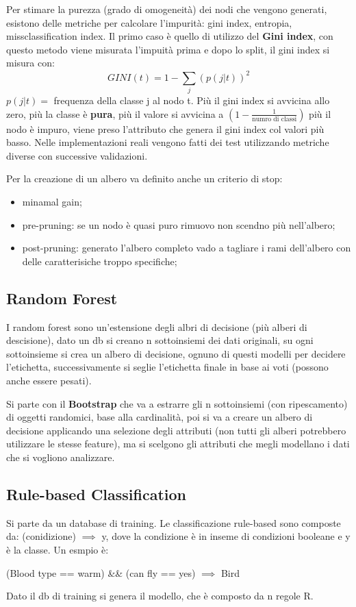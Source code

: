 \documentclass[12pt]{article}
\begin{document}
Per stimare la purezza (grado di omogeneit\`a) dei nodi che vengono generati, esistono delle metriche per calcolare l'impurit\`a: gini index, entropia, missclassification index. Il primo caso \`e quello di utilizzo del \textbf{Gini index}, con questo metodo viene misurata l'impuit\`a prima e dopo lo split, il gini index si misura con:
\[ GINI(t) = 1 - \sum_{j}^{} (p(j|t))^{2} \]
$p(j|t) = $ frequenza della classe j al nodo t. Pi\`u il gini index si avvicina allo zero, pi\`u la classe \`e \textbf{pura}, pi\`u il valore si avvicina a $(1 - \frac{1}{\text{numro di classi}} )$ pi\`u il nodo \`e impuro, viene preso l'attributo che genera il gini index col valori pi\`u basso. Nelle implementazioni reali vengono fatti dei test utilizzando metriche diverse con successive validazioni.

Per la creazione di un albero va definito anche un criterio di stop:
\begin{itemize}
    \item minamal gain;
    \item pre-pruning: se un nodo \`e quasi puro rimuovo non scendno pi\`u nell'albero;
    \item post-pruning: generato l'albero completo vado a tagliare i rami dell'albero con delle caratterisiche troppo specifiche;
\end{itemize}



\subsection{Random Forest}
I random forest sono un'estensione degli albri di decisione (pi\`u alberi di descisione), dato un db si creano n sottoinsiemi dei dati originali, su ogni sottoinsieme si crea un albero di decisione, ognuno di questi modelli per decidere l'etichetta, successivamente si seglie l'etichetta finale in base ai voti (possono anche essere pesati).

Si parte con il \textbf{Bootstrap} che va a estrarre gli n sottoinsiemi (con ripescamento) di oggetti randomici, base alla cardinalit\`a, poi si va a creare un albero di decisione applicando una selezione degli attributi (non tutti gli alberi potrebbero utilizzare le stesse feature), ma si scelgono gli attributi che megli modellano i dati che si vogliono analizzare.


\subsection{Rule-based Classification}
Si parte da un database di training. Le classificazione rule-based sono composte da: (conidizione) $ \implies $ y, dove la condizione \`e in inseme di condizioni booleane e y \`e la classe. Un esmpio \`e:
\begin{center}
    (Blood type == warm) \&\& (can fly == yes) $ \implies$ Bird
\end{center}
Dato il db di training si genera il modello, che \`e composto da n regole R.
\end{document}
